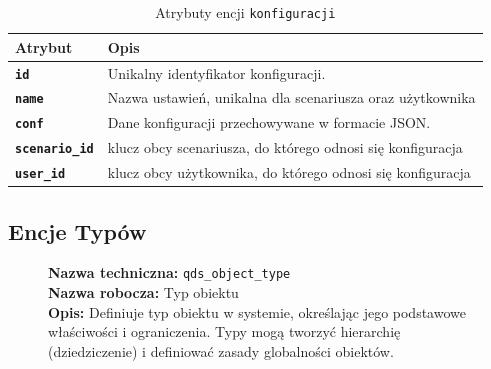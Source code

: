\begin{table}[H]
    \centering
    \renewcommand{\arraystretch}{1.6}
    \begin{tabular}{|>{\bfseries}l|p{}|}
        \hline
        \rowcolor[HTML]{EFEFEF} \textbf{Atrybut} & \textbf{Opis} \\
        \hline
        \texttt{id} & Unikalny identyfikator konfiguracji. \\
        \hline
        \texttt{name} & Nazwa ustawień, unikalna dla scenariusza oraz użytkownika \\
        \hline
        \texttt{conf} & Dane konfiguracji przechowywane w formacie JSON. \\
        \hline
        \texttt{scenario\_id} & klucz obcy scenariusza, do którego odnosi się konfiguracja \\
        \hline
        \texttt{user\_id} & klucz obcy użytkownika, do którego odnosi się konfiguracja \\
        \hline
    \end{tabular}
    \caption{Atrybuty encji \texttt{konfiguracji}}
\end{table}

\subsection{Encje Typów}

\begin{figure}[H]
    \centering
    \begin{minipage}{0.8\textwidth} 
        \begin{framed}
            \noindent\textbf{\large Nazwa techniczna:} \texttt{qds\_object\_type} \\
            \textbf{\large Nazwa robocza:} Typ obiektu \\
            \textbf{\large Opis:} Definiuje typ obiektu w systemie, określając jego podstawowe właściwości
            i ograniczenia. Typy mogą tworzyć hierarchię (dziedziczenie) i definiować zasady globalności obiektów.
        \end{framed}
    \end{minipage}
\end{figure}

